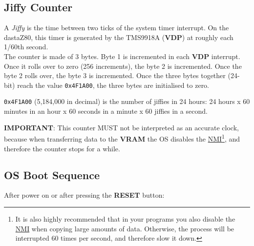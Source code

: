 \documentclass[a4paper,11pt]{article}
\begin{document}
    \subsection{Jiffy Counter}
    \label{subsec:jiffy_counter}

    A \textit{Jiffy} is the time between two ticks of the system timer interrupt.
    On the dastaZ80, this timer is generated by the TMS9918A (\textbf{VDP}) at
    roughly each 1/60th second.\\

    The counter is made of 3 bytes. Byte 1 is incremented in each \textbf{VDP}
    interrupt. Once it rolls over to zero (256 increments), the byte 2 is
    incremented. Once the byte 2 rolls over, the byte 3 is incremented. Once the
    three bytes together (24-bit) reach the value \texttt{0x4F1A00}, the three
    bytes are initialised to zero.

    \texttt{0x4F1A00} (5,184,000 in decimal) is the number of jiffies in 24
    hours: 24 hours x 60 minutes in an hour x 60 seconds in a minute x 60
    jiffies in a second.

    \textbf{IMPORTANT}: This counter MUST not be interpreted as an accurate
    clock, because when transferring data to the \textbf{VRAM} the OS disables
    the \hyperref[sec:nmi]{NMI}\footnote{It is also highly recommended that in
    your programs you also disable the \hyperref[sec:nmi]{NMI} when copying
    large amounts of data. Otherwise, the process will be interrupted 60 times
    per second, and therefore slow it down.}, and therefore the counter stops
    for a while.

    \subsection{OS Boot Sequence}
    After power on or after pressing the \textbf{RESET} button:
\end{document}
